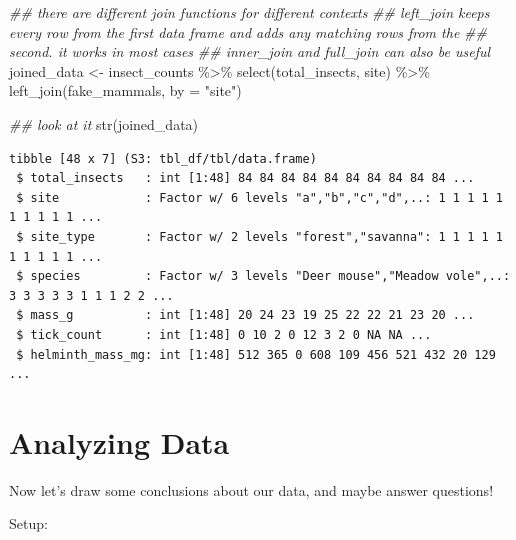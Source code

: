 \documentclass[
  letterpaper,
  DIV=11,
  numbers=noendperiod]{scrreprt}
\newenvironment{Shaded}{\begin{snugshade}}{\end{snugshade}}
\newcommand{\AttributeTok}[1]{\textcolor[rgb]{0.40,0.45,0.13}{#1}}
\newcommand{\DocumentationTok}[1]{\textcolor[rgb]{0.37,0.37,0.37}{\textit{#1}}}
\newcommand{\FunctionTok}[1]{\textcolor[rgb]{0.28,0.35,0.67}{#1}}
\newcommand{\NormalTok}[1]{\textcolor[rgb]{0.00,0.23,0.31}{#1}}
\newcommand{\OtherTok}[1]{\textcolor[rgb]{0.00,0.23,0.31}{#1}}
\newcommand{\SpecialCharTok}[1]{\textcolor[rgb]{0.37,0.37,0.37}{#1}}
\newcommand{\StringTok}[1]{\textcolor[rgb]{0.13,0.47,0.30}{#1}}
\begin{document}
\begin{Shaded}
\begin{Highlighting}[]
\DocumentationTok{\#\# there are different join functions for different contexts}
\DocumentationTok{\#\# left\_join keeps every row from the first data frame and adds any matching rows from the}
\DocumentationTok{\#\# second. it works in most cases}
\DocumentationTok{\#\# inner\_join and full\_join can also be useful}
\NormalTok{joined\_data }\OtherTok{\textless{}{-}}\NormalTok{ insect\_counts }\SpecialCharTok{\%\textgreater{}\%}
  \FunctionTok{select}\NormalTok{(total\_insects, site) }\SpecialCharTok{\%\textgreater{}\%}
  \FunctionTok{left\_join}\NormalTok{(fake\_mammals, }\AttributeTok{by =} \StringTok{"site"}\NormalTok{)}

\DocumentationTok{\#\# look at it}
\FunctionTok{str}\NormalTok{(joined\_data)}
\end{Highlighting}
\end{Shaded}

\begin{verbatim}
tibble [48 x 7] (S3: tbl_df/tbl/data.frame)
 $ total_insects   : int [1:48] 84 84 84 84 84 84 84 84 84 84 ...
 $ site            : Factor w/ 6 levels "a","b","c","d",..: 1 1 1 1 1 1 1 1 1 1 ...
 $ site_type       : Factor w/ 2 levels "forest","savanna": 1 1 1 1 1 1 1 1 1 1 ...
 $ species         : Factor w/ 3 levels "Deer mouse","Meadow vole",..: 3 3 3 3 3 1 1 1 2 2 ...
 $ mass_g          : int [1:48] 20 24 23 19 25 22 22 21 23 20 ...
 $ tick_count      : int [1:48] 0 10 2 0 12 3 2 0 NA NA ...
 $ helminth_mass_mg: int [1:48] 512 365 0 608 109 456 521 432 20 129 ...
\end{verbatim}

\hypertarget{analyzing-data}{%
\chapter{Analyzing Data}\label{analyzing-data}}

Now let's draw some conclusions about our data, and maybe answer
questions!

Setup:
\end{document}
